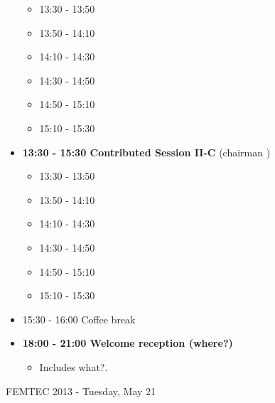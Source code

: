 \documentclass[10pt, A4]{article}%
\begin{document}
\begin{itemize}
\begin{itemize}
    \item 13:30 - 13:50 
    \item 13:50 - 14:10 
    \item 14:10 - 14:30 
    \item 14:30 - 14:50 
    \item 14:50 - 15:10 
    \item 15:10 - 15:30 
  \end{itemize}
\newpage
    \item {\bf 13:30 - 15:30 Contributed Session II-C} (chairman ) 
  \begin{itemize}
    \item 13:30 - 13:50 
    \item 13:50 - 14:10 
    \item 14:10 - 14:30 
    \item 14:30 - 14:50 
    \item 14:50 - 15:10 
    \item 15:10 - 15:30 
  \end{itemize}
  \item 15:30 - 16:00 Coffee break
  \item {\bf 18:00 - 21:00 Welcome reception (where?)} 
  \begin{itemize}
     \item Includes what?.
  \end{itemize}
\end{itemize}

\newpage

\centerline{\huge FEMTEC 2013 - Tuesday, May 21}
\vspace{4mm}
\end{document}
